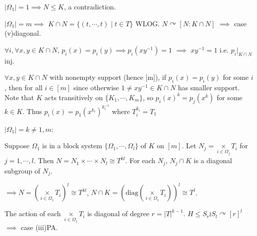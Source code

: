 \documentclass[a4paper,11pt]{article}
\begin{document}
$|\Omega_1|=1\implies N\leq K$, a contradiction.

$|\Omega_1|=m\implies$ $K\cap N=\{(t,\cdots,t)\mid t\in T\}$ WLOG.  $N\curvearrowright [N:K\cap N]$ $\implies$ case (v)diagonal.

{\color{gray}
$\forall i, \forall x, y \in K\cap N$, $p_i(x)=p_i(y)\implies p_i(xy^{-1})=1$ $\implies$ $xy^{-1}=1$ i.e. $p_i|_{K\cap N}$ inj. 

$\forall x,y\in K\cap N$ with nonempty support (hence [m]), if $p_i(x)= p_i(y)$ for some $i$, then for all $i\in [m]$ since otherwise $1\neq xy^{-1}\in K\cap N$ has smaller support. Note that $K$ acts transitively on $\{K_1,\cdots,K_m\}$, so $p_i(x)^k=p_j(x^k)$ for some $k\in K$. Thus $p_i(x)=p_1(x^{k_i})^{k_i^{-1}}$ where $T_i^{k_i}=T_1$
}


$|\Omega_1|=k\neq 1,m$:

Suppose $\Omega_1$ is in a block system $\{\Omega_1,\cdots,\Omega_l\}$ of $K$ on $[m]$. Let $N_j=\mathop{\times}\limits_{i\in\Omega_j}T_i$ for $j=1,\cdots,l$. Then $N=N_1\times\cdots\times N_l\cong T^{kl}$. For each $N_j$, $N_j\cap K$ is a diagonal subgroup of $N_j$.

$\implies N=\left(\mathop{\times}\limits_{i\in\Omega_1}T_i\right)^{l}\cong T^{kl}$, $N\cap K=\left(\mathrm{diag}\left(\mathop{\times}\limits_{i\in\Omega_1}T_i\right)\right)^l\cong T^l$.

The action of each $\mathop{\times}\limits_{i\in\Omega_1}T_i$ is diagonal of degree $r=|T|^{k-1}$. $H\leq S_r\wr S_l\curvearrowright [r]^l$ $\implies$ case (iii)PA.





\ifx\ChapTwoSecSix\undefined
     
\end{document}
